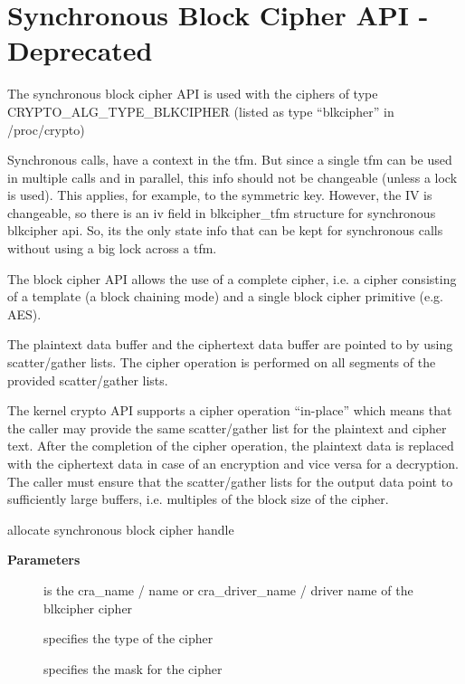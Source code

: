 \documentclass[a4paper,8pt,english]{sphinxmanual}
\begin{document}
\section{Synchronous Block Cipher API - Deprecated}
\label{crypto/api-skcipher:synchronous-block-cipher-api-deprecated}
The synchronous block cipher API is used with the ciphers of type
CRYPTO\_ALG\_TYPE\_BLKCIPHER (listed as type ``blkcipher'' in /proc/crypto)

Synchronous calls, have a context in the tfm. But since a single tfm can be
used in multiple calls and in parallel, this info should not be changeable
(unless a lock is used). This applies, for example, to the symmetric key.
However, the IV is changeable, so there is an iv field in blkcipher\_tfm
structure for synchronous blkcipher api. So, its the only state info that can
be kept for synchronous calls without using a big lock across a tfm.

The block cipher API allows the use of a complete cipher, i.e. a cipher
consisting of a template (a block chaining mode) and a single block cipher
primitive (e.g. AES).

The plaintext data buffer and the ciphertext data buffer are pointed to
by using scatter/gather lists. The cipher operation is performed
on all segments of the provided scatter/gather lists.

The kernel crypto API supports a cipher operation ``in-place'' which means that
the caller may provide the same scatter/gather list for the plaintext and
cipher text. After the completion of the cipher operation, the plaintext
data is replaced with the ciphertext data in case of an encryption and vice
versa for a decryption. The caller must ensure that the scatter/gather lists
for the output data point to sufficiently large buffers, i.e. multiples of
the block size of the cipher.

\begin{fulllineitems}
\label{crypto/api-skcipher:c.crypto_alloc_blkcipher}
allocate synchronous block cipher handle

\end{fulllineitems}


\textbf{Parameters}
\begin{description}
\item[{}] \leavevmode
is the cra\_name / name or cra\_driver\_name / driver name of the
blkcipher cipher

\item[{}] \leavevmode
specifies the type of the cipher

\item[{}] \leavevmode
specifies the mask for the cipher

\end{description}
\end{document}
